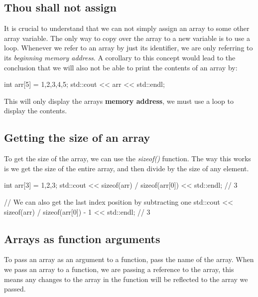 \documentclass{report}
\begin{document}
   \bigbreak \noindent 
   \subsection{Thou shall not assign}
   \bigbreak \noindent 
   It is crucial to understand  that we can not simply assign an array to some other array variable. The only way to copy over the array to a new variable is to use a loop. Whenever we refer to an array by just its identifier, we are only referring to its \textit{beginning memory address}.
   \bigbreak \noindent 
   A corollary to this concept would lead to the conclusion that we will also not be able to print the contents of an array by:
   \bigbreak \noindent 
   
   \begin{cppcode}
int arr[5] = {1,2,3,4,5};
std::cout << arr << std::endl;

   \end{cppcode}
   
   \bigbreak \noindent 
   This will only display the arrays \textbf{memory address}, we must use a loop to display the contents.

   \pagebreak \bigbreak \noindent 
   \subsection{Getting the size of an array}
   \bigbreak \noindent 
   To get the size of the array, we can use the \textit{sizeof()} function. The way this works is we get the size of the entire array, and then divide by the size of any element.
   \bigbreak \noindent 
    
    \begin{cppcode}
int arr[3] = {1,2,3};
std::cout << sizeof(arr) / sizeof(arr[0]) << std::endl;  // 3

// We can also get the last index position by subtracting one
    std::cout << sizeof(arr) / sizeof(arr[0]) - 1 << std::endl;  // 3
    \end{cppcode}
    
    \bigbreak \noindent 

    \bigbreak \noindent 
    \subsection{Arrays as function arguments}
    \bigbreak \noindent 
    \begin{concept}
  To pass an array as an argument to a function, pass the name of the array. When we pass an array to a function, we are passing a reference to the array, this means any changes to the array in the function will be reflected to the array we passed.
	\end{concept}
    \bigbreak \noindent 
    
\end{document}
